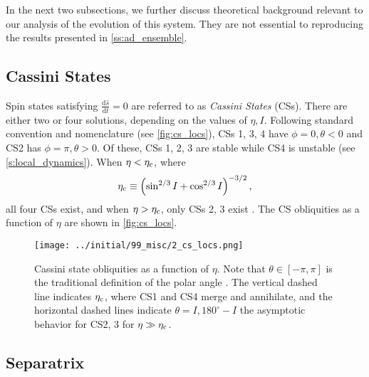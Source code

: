 \documentclass[
        fleqn,
        usenatbib,
        referee,
    ]{mnras}
\newcommand*{\rd}[2]{\frac{\mathrm{d}#1}{\mathrm{d}#2}}
\newcommand*{\p}[1]{\left(#1\right)}
\begin{document}
In the next two subsections, we further discuss theoretical background relevant
to our analysis of the evolution of this system. They are not essential to
reproducing the results presented in \autoref{ss:ad_ensemble}.

\subsection{Cassini States}\label{ss:cs}

Spin states satisfying $\rd{\hat{s}}{t} = 0$ are referred to as \emph{Cassini
States} (CSs). There are either two or four solutions, depending on the values
of $\eta, I$. Following standard convention and nomenclature (see
\autoref{fig:cs_locs}), CSs 1, 3, 4 have $\phi = 0, \theta < 0$ and CS2 has
$\phi = \pi, \theta > 0$. Of these, CSs 1, 2, 3 are stable while CS4 is unstable
(see \autoref{s:local_dynamics}). When $\eta < \eta_{\rm c}$, where
\begin{equation}
    \eta_{\rm c} \equiv \p{\sin^{2/3}I + \cos^{2/3}I}^{-3/2},
\end{equation}
all four CSs exist, and when $\eta > \eta_{\rm c}$, only CSs 2, 3 exist
\citep{henrard1987,ward2004I}. The CS obliquities as a function of $\eta$ are
shown in \autoref{fig:cs_locs}.
\begin{figure}
    \centering
    \texttt{[image: ../initial/99\_misc/2\_cs\_locs.png]}
    \caption{Cassini state obliquities as a function of $\eta$. Note that
    $\theta \in [-\pi, \pi]$ is the traditional definition of the polar angle
    \citep[see e.g.][]{colombo1966,peale1969,henrard1987}. The vertical dashed
    line indicates $\eta_{\rm c}$, where CS1 and CS4 merge and annihilate, and the
    horizontal dashed lines indicate $\theta = I, 180^\circ - I$ the asymptotic
    behavior for CS2, 3 for $\eta \gg \eta_{\rm c}$.}\label{fig:cs_locs}
\end{figure}

\subsection{Separatrix}
\end{document}
